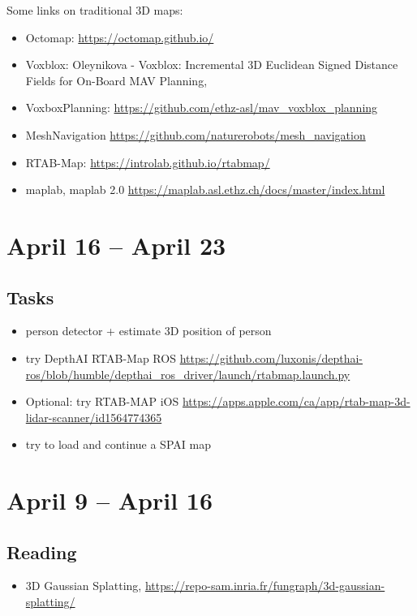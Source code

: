 \documentclass{article}
\begin{document}
Some links on traditional 3D maps:
\begin{itemize}
\item Octomap: \url{https://octomap.github.io/}
\item Voxblox: Oleynikova - Voxblox: Incremental 3D Euclidean Signed Distance Fields for On-Board MAV Planning, 
\item VoxboxPlanning: \url{https://github.com/ethz-asl/mav_voxblox_planning}
\item MeshNavigation \url{https://github.com/naturerobots/mesh_navigation}
\item RTAB-Map: \url{https://introlab.github.io/rtabmap/}
\item maplab, maplab 2.0 \url{https://maplab.asl.ethz.ch/docs/master/index.html}
\end{itemize}

\section{April 16 -- April 23}

\subsection{Tasks}
\begin{itemize}
\item person detector + estimate 3D position of person
\item try DepthAI RTAB-Map ROS \url{https://github.com/luxonis/depthai-ros/blob/humble/depthai_ros_driver/launch/rtabmap.launch.py}
\item Optional: try RTAB-MAP iOS \url{https://apps.apple.com/ca/app/rtab-map-3d-lidar-scanner/id1564774365}
\item try to load and continue a SPAI map
\end{itemize}
\newpage


\section{April 9 -- April 16}
\subsection{Reading}
\begin{itemize}
\item 3D Gaussian Splatting, \url{https://repo-sam.inria.fr/fungraph/3d-gaussian-splatting/}
\end{itemize}
\end{document}
